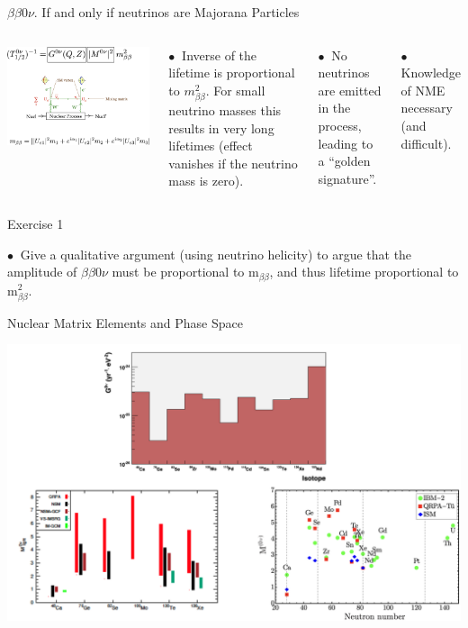 \documentclass [aspectratio=169]{beamer}
\begin{document}
\begin{frame}{$\beta\beta0\nu$. If and only if neutrinos are Majorana Particles}

\begin{columns}
\includegraphics[scale=0.25]{bb0nu.png}

$\bullet~$ Inverse of the lifetime is proportional to $m_{\beta\beta}^2$. For small neutrino masses this results in very long lifetimes (effect vanishes if the neutrino mass is zero). 

$\bullet~$ No neutrinos are emitted in the process, leading to a ``golden signature''.

$\bullet~$ Knowledge of NME necessary (and difficult).
 
\end{columns}
\end{frame}

\begin{frame}{Exercise 1}

$\bullet~$ Give a qualitative argument (using neutrino helicity) to argue that the amplitude of  $\beta\beta0\nu$ must be proportional to m$_{\beta\beta}$, and thus lifetime proportional to m$_{\beta\beta}^2$.
\end{frame}


\begin{frame}{Nuclear Matrix Elements and Phase Space}

\includegraphics[scale=0.25]{nme2.png}

\end{frame}
\end{document}
